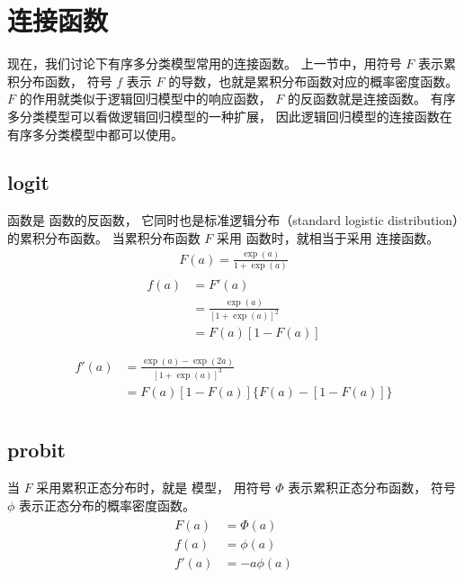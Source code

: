 \documentclass[letterpaper,10pt,english]{sphinxmanual}
\begin{document}
\section{连接函数}
\label{\detokenize{_u6709_u5e8f_u79bb_u6563_u6a21_u578b/content:id4}}
现在，我们讨论下有序多分类模型常用的连接函数。
上一节中，用符号 \(F\) 表示累积分布函数，
符号 \(f\) 表示 \(F\) 的导数，也就是累积分布函数对应的概率密度函数。
\(F\) 的作用就类似于逻辑回归模型中的响应函数，
\(F\) 的反函数就是连接函数。
有序多分类模型可以看做逻辑回归模型的一种扩展，
因此逻辑回归模型的连接函数在有序多分类模型中都可以使用。


\subsection{logit}
\label{\detokenize{_u6709_u5e8f_u79bb_u6563_u6a21_u578b/content:logit}}
 函数是  函数的反函数，
它同时也是标准逻辑分布（standard logistic distribution）的累积分布函数。
当累积分布函数 \(F\) 采用 
函数时，就相当于采用  连接函数。
\begin{equation}\label{equation:有序离散模型/content:有序离散模型/content:11}
\begin{split}F(a) = \frac{\exp(a)  }{1+\exp(a)}\end{split}
\end{equation}\begin{align}\label{equation:有序离散模型/content:有序离散模型/content:12}\!\begin{aligned}
f(a) &= F'(a)\\
&= \frac{\exp(a)  }{[1+\exp(a)]^2}\\
&= F(a)[1-F(a)]\\
\end{aligned}\end{align}\begin{align}\label{equation:有序离散模型/content:有序离散模型/content:13}\!\begin{aligned}
f'(a) &=\frac{\exp(a) - \exp{ (2a) }  }{[1+\exp(a)]^3}\\
&= F(a)[1-F(a)]\{ F(a)-[1-F(a)] \}\\
\end{aligned}\end{align}

\subsection{probit}
\label{\detokenize{_u6709_u5e8f_u79bb_u6563_u6a21_u578b/content:probit}}
当 \(F\) 采用累积正态分布时，就是  模型，
用符号 \(\Phi\) 表示累积正态分布函数，
符号 \(\phi\) 表示正态分布的概率密度函数。
\begin{align}\label{equation:有序离散模型/content:有序离散模型/content:14}\!\begin{aligned}
F(a) &= \Phi(a)\\
f(a) &= \phi(a)\\
f'(a) &= -a\phi(a)\\
\end{aligned}\end{align}
\end{document}
